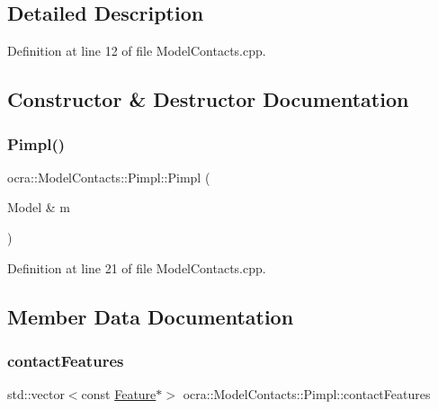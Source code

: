 \subsection{Detailed Description}


Definition at line 12 of file Model\+Contacts.\+cpp.



\subsection{Constructor \& Destructor Documentation}
\hypertarget{structocra_1_1ModelContacts_1_1Pimpl_a49e42d553f4cb66b8c6207e63733d410}{}\label{structocra_1_1ModelContacts_1_1Pimpl_a49e42d553f4cb66b8c6207e63733d410} 
\subsubsection{\texorpdfstring{Pimpl()}{Pimpl()}}
{\footnotesize\ttfamily ocra\+::\+Model\+Contacts\+::\+Pimpl\+::\+Pimpl (\begin{DoxyParamCaption}\item[{Model \&}]{m }\end{DoxyParamCaption})\hspace{0.3cm}{\ttfamily [inline]}}



Definition at line 21 of file Model\+Contacts.\+cpp.



\subsection{Member Data Documentation}
\hypertarget{structocra_1_1ModelContacts_1_1Pimpl_ac15c6469b805fa54ffb5422a7b1014bd}{}\label{structocra_1_1ModelContacts_1_1Pimpl_ac15c6469b805fa54ffb5422a7b1014bd} 
\subsubsection{\texorpdfstring{contact\+Features}{contactFeatures}}
{\footnotesize\ttfamily std\+::vector$<$const \hyperlink{classocra_1_1Feature}{Feature}$\ast$$>$ ocra\+::\+Model\+Contacts\+::\+Pimpl\+::contact\+Features}



